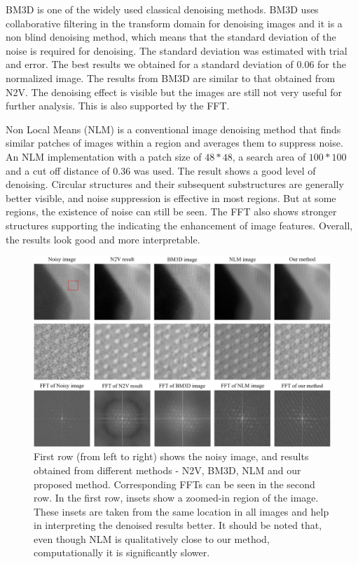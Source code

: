 \documentclass[fleqn,10pt]{wlscirep}
\begin{document}
	BM3D \cite{DBLP:journals/tip/BM3D} is one of the widely used classical denoising methods. BM3D uses collaborative filtering in the transform domain for denoising images and it is a non blind denoising method, which means that the standard deviation of the noise is required for denoising. The standard deviation was estimated with trial and error. The best results we obtained for a standard deviation of 0.06 for the normalized image. The results from BM3D are similar to that obtained from N2V. The denoising effect is visible but the images are still not very useful for further analysis. This is also supported by the FFT.
	
		
	Non Local Means (NLM) \cite{bcm_nlm} is a conventional image denoising method that finds similar patches of images within a region and averages them to suppress noise. An NLM implementation with a patch size of $48*48$, a search area of $100*100$ and a cut off distance of 0.36 was used. The result shows a good level of denoising. Circular structures and their subsequent substructures are generally better visible, and noise suppression is effective in most regions. But at some regions, the existence of noise can still be seen. The FFT also shows stronger structures supporting the indicating the enhancement of image features. Overall, the results look good and more interpretable. 
	
	\begin{figure}[H]
		\centering
		\includegraphics[scale=0.4]{./imgs/comparison-zoomed.jpg}
		\caption{First row (from left to right) shows the noisy image, and results obtained from different methods - N2V, BM3D, NLM and our proposed method. Corresponding FFTs can be seen in the second row. In the first row, insets show a zoomed-in region of the image. These insets are taken from the same location in all images and help in interpreting the denoised results better. It should be noted that, even though NLM is qualitatively close to our method, computationally it is significantly slower. }
		\label{fig:comparison}
	\end{figure}
		
\end{document}
